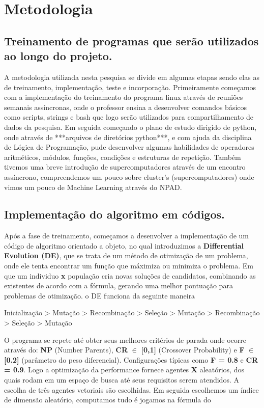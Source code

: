 \documentclass[a4paper, 12pt]{article}
\begin{document}
\section{Metodologia}

\subsection{Treinamento de programas que serão utilizados ao longo do projeto.}

  A metodologia utilizada nesta pesquisa se divide em algumas
  etapas sendo elas as de treinamento, implementação, teste e incorporação.
  Primeiramente começamos com a implementação do treinamento do programa linux através de reuniões semanais assíncronas, onde o professor ensina a desenvolver  comandos básicos como scripts, strings e bash que logo serão utilizados para compartilhamento de dados da pesquisa.
  Em seguida começando o plano de estudo dirigido de python, onde através de ***arquivos de diretórios python***, e com ajuda da disciplina de Lógica de Programação, pude desenvolver algumas habilidades de operadores aritméticos, módulos, funções, condições e estruturas de repetição.
  Também tivemos uma breve introdução de supercomputadores através de um encontro assíncrono, compreendemos um pouco sobre cluster’s (supercomputadores) onde vimos um pouco de Machine Learning através do NPAD.

\subsection{Implementação do algoritmo em códigos.}

 Após a fase de treinamento, começamos a desenvolver a implementação de um código de algoritmo orientado a objeto, no qual introduzimos a \textbf{Differential Evolution (DE)}, que se trata de um método de otimização de um problema, onde ele tenta encontrar um função que máximiza ou minimiza o problema. Em que um individuo \textbf{x} população cria novas soluções de candidatos, combinando as existentes de acordo com a fórmula, gerando uma melhor pontuação para problemas de otimização.
 o DE funciona da seguinte maneira 


Inicialização > Mutação > Recombinação > Seleção > Mutação > Recombinação > Seleção > Mutação %


 O programa se repete até obter seus melhores critérios de parada onde ocorre através do: \textbf{NP} (Number Parents), \textbf{CR} $\in$ \textbf{[0,1]} (Crossover Probability) e   \textbf{F} $\in$ \textbf{[0.2]} (parâmetro do peso diferencial). Configurações típicas como \textbf{F = 0.8}  e  \textbf{CR = 0.9}. Logo a optimização da performance fornece agentes \textbf{X} aleatórios, dos quais rodam em um espaço de busca até seus requisitos serem atendidos. A escolha de três agentes vetoriais são escolhidas. Em seguida escolhemos um índice de dimensão aleatório, computamos tudo é jogamos na fórmula do 
 
\end{document}
